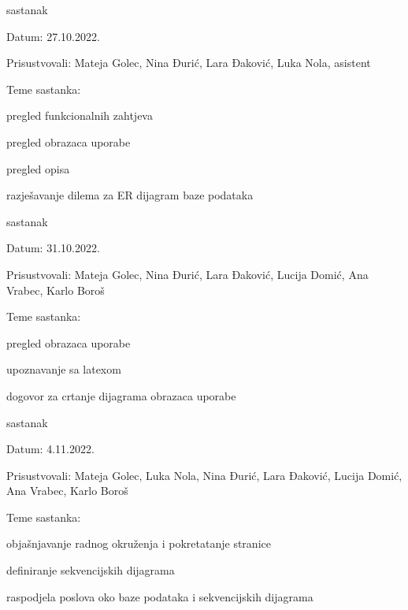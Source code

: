 \begin{packed_enum}
			\item  sastanak
			\item[] \begin{packed_item}
				\item Datum: 27.10.2022.
				\item Prisustvovali: Mateja Golec, Nina Đurić, Lara Đaković, Luka Nola, asistent
				\item Teme sastanka:
				\begin{packed_item}
					\item  pregled funkcionalnih zahtjeva
					\item  pregled obrazaca uporabe
					\item  pregled opisa
					\item  razješavanje dilema za ER dijagram baze podataka
				\end{packed_item}
			\end{packed_item}

			\item  sastanak
			\item[] \begin{packed_item}
				\item Datum: 31.10.2022.
				\item Prisustvovali: Mateja Golec, Nina Đurić, Lara Đaković, Lucija Domić, Ana Vrabec, Karlo Boroš
				\item Teme sastanka:
				\begin{packed_item}
					\item  pregled obrazaca uporabe
					\item  upoznavanje sa latexom
					\item  dogovor za crtanje dijagrama obrazaca uporabe
				\end{packed_item}
			\end{packed_item}

			\item  sastanak
			\item[] \begin{packed_item}
				\item Datum: 4.11.2022.
				\item Prisustvovali: Mateja Golec, Luka Nola, Nina Đurić, Lara Đaković, Lucija Domić, Ana Vrabec, Karlo Boroš
				\item Teme sastanka:
				\begin{packed_item}
					\item  objašnjavanje radnog okruženja i pokretatanje stranice
					\item  definiranje sekvencijskih dijagrama
					\item  raspodjela poslova oko baze podataka i sekvencijskih dijagrama
				\end{packed_item}
			\end{packed_item}


\end{packed_enum}
